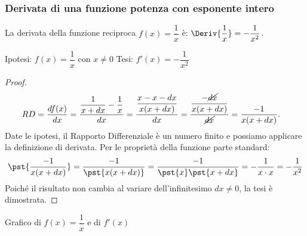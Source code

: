  \subsubsection{Derivata di una funzione potenza con esponente intero}
\label{subsubsec:derivata_f_potenza_Z} 
 
\begin{teorema}
La derivata della funzione reciproca \(f(x)=\dfrac{1}{x}\) è: \quad
\(\Deriv{\dfrac{1}{x}}=-\dfrac{1}{x^2}\).
\end{teorema}
\noindent Ipotesi: \(f(x)=\dfrac{1}{x}\) \quad  con \(x \ne 0\)\tab 
Tesi: \(f'(x)=-\dfrac{1}{x^2}\)
\begin{proof}
\begin{align*}
 &RD=\dfrac{df(x)}{dx}=\dfrac{\dfrac{1}{x+dx}-\dfrac{1}{x}}{dx}= 
\dfrac{\dfrac{x-x-dx}{x(x+dx)}}{dx}=
\dfrac{\dfrac{-\cancel{dx}}{x(x+dx)}}{\cancel{dx}}=\dfrac{-1}{x(x+dx)}.
\end{align*}
Date le ipotesi, il Rapporto Differenziale è un numero finito e 
possiamo applicare la definizione di derivata. 
Per le proprietà della funzione parte standard:
\[ \pst{\dfrac{-1}{x(x+dx)}}=
\dfrac{-1}{\pst{x(x+dx)}}=\dfrac{-1}{\pst{x}\pst{x+dx}}=
      -\dfrac{1}{x\cdot x}=-\dfrac{1}{x^2}\]
Poiché il risultato non cambia al variare dell'infinitesimo \(dx \ne 0\), 
la tesi è dimostrata.
\end{proof}

\begin{inaccessibleblock}
\hspace{-20mm}
\end{inaccessibleblock}
\label{img:diff_cubica_con_pendenze}
\begin{center}Grafico di \(f(x)=\dfrac{1}{x}\) e di \(f'(x)\) \end{center}

